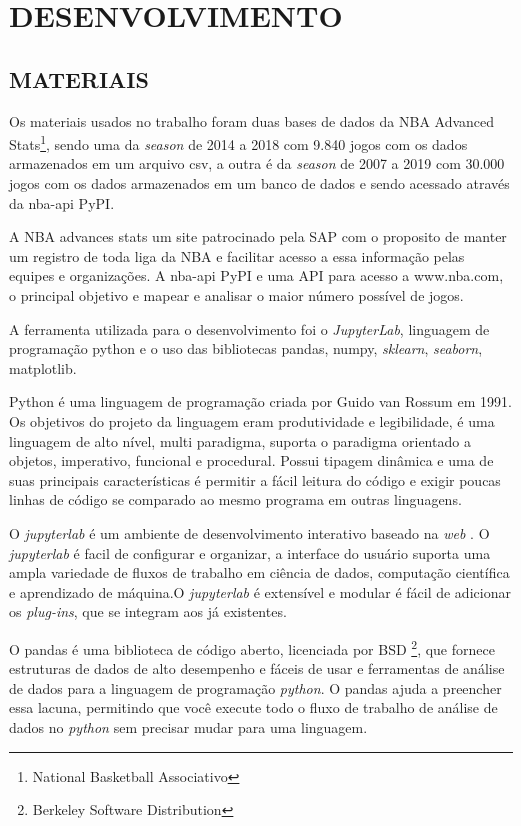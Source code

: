 \section{DESENVOLVIMENTO}
\subsection{MATERIAIS}

Os materiais usados no trabalho foram duas bases de dados da NBA Advanced Stats\footnote{National Basketball Associativo}, sendo uma da \textit{season} de 2014 a 2018 com 9.840 jogos com os dados armazenados em um arquivo csv, a outra é da \textit{season} de 2007 a 2019 com 30.000 jogos com os dados armazenados em um banco de dados e sendo acessado através da nba-api PyPI. 

A NBA advances stats um site patrocinado pela SAP com o proposito de manter um registro de toda liga da NBA e facilitar  acesso a essa informação pelas equipes e organizações. A nba-api PyPI e uma API para acesso a www.nba.com, o principal objetivo e mapear e analisar o maior número possível de jogos.

A ferramenta utilizada para o desenvolvimento foi o \textit{JupyterLab}, linguagem de programação {python} e o uso das bibliotecas  pandas, numpy, \textit{sklearn}, \textit{seaborn}, matplotlib.

Python é uma linguagem de programação criada por Guido van Rossum em 1991. Os objetivos do projeto da linguagem eram produtividade e legibilidade, é uma linguagem de alto nível, multi paradigma, suporta o paradigma orientado a objetos, imperativo, funcional e procedural. Possui tipagem dinâmica e uma de suas principais características é permitir a fácil leitura do código e exigir poucas linhas de código se comparado ao mesmo programa em outras linguagens\cite{python}.

O \textit{jupyterlab} é um ambiente de desenvolvimento interativo baseado na \textit{web} . O \textit{jupyterlab} é facil de configurar e organizar, a interface do usuário suporta uma ampla variedade de fluxos de trabalho em ciência de dados, computação científica e aprendizado de máquina.O \textit{jupyterlab} é extensível e modular é fácil de adicionar os \textit{plug-ins}, que se integram aos já existentes\cite{jupyter}.

O pandas é uma biblioteca de código aberto, licenciada por BSD \footnote{Berkeley Software Distribution}, que fornece estruturas de dados de alto desempenho e fáceis de usar e ferramentas de análise de dados para a linguagem de programação \textit{python}. O pandas ajuda a preencher essa lacuna, permitindo que você execute todo o fluxo de trabalho de análise de dados no \textit{python} sem precisar mudar para uma linguagem\cite{pandas}.

